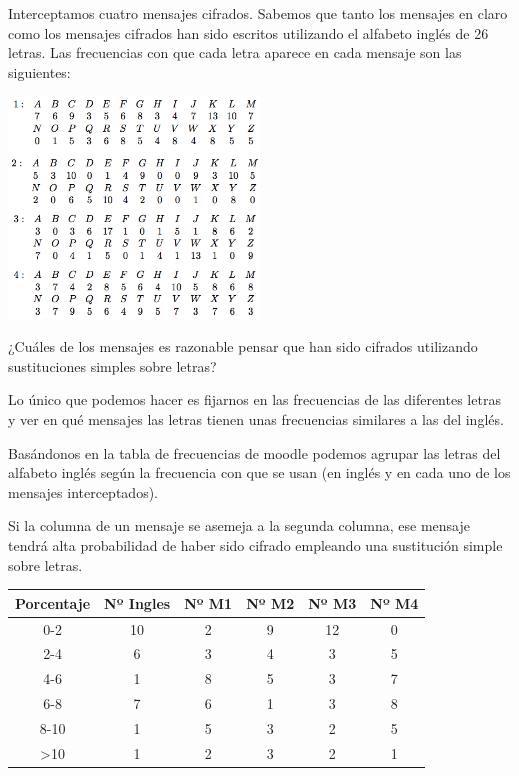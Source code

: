 \begin{problem}[6]
	Interceptamos cuatro mensajes cifrados. Sabemos que tanto los mensajes en claro como los mensajes cifrados han sido escritos utilizando el alfabeto inglés de 26 letras. Las frecuencias con que cada letra aparece en cada mensaje son las siguientes:

	\begin{center}
		\includegraphics[width=0.5\textwidth]{img/freqsEj1_6}
	\end{center}

	¿Cuáles de los mensajes es razonable pensar que han sido cifrados utilizando sustituciones simples sobre letras?

	\solution

	Lo único que podemos hacer es fijarnos en las frecuencias de las diferentes letras y ver en qué mensajes las letras tienen unas frecuencias similares a las del inglés.

	Basándonos en la tabla de frecuencias de moodle podemos agrupar las letras del alfabeto inglés según la frecuencia con que se usan (en inglés y en cada uno de los mensajes interceptados).

	Si la columna de un mensaje se asemeja a la segunda columna, ese mensaje tendrá alta probabilidad de haber sido cifrado empleando una sustitución simple sobre letras.

	\begin{center}
	\begin{tabular}{| c | c || c | c | c | c |}
	\hline
	\textbf{Porcentaje} & \textbf{Nº Ingles} & \textbf{Nº M1} & \textbf{Nº M2} & \textbf{Nº M3} & \textbf{Nº M4} \\
	\hline
	0-2 & 10 & 2 & 9 & 12 & 0\\
	\hline
	2-4 & 6 & 3 & 4 & 3 & 5 \\
	\hline
	4-6 & 1 & 8 & 5 & 3 & 7 \\
	\hline
	6-8 & 7 & 6 & 1 & 3 & 8 \\
	\hline
	8-10 & 1 & 5 & 3 & 2 & 5 \\
	\hline
	>10 & 1 & 2 & 3 & 2 & 1 \\
	\hline
	\end{tabular}
	\end{center}


\end{problem}
